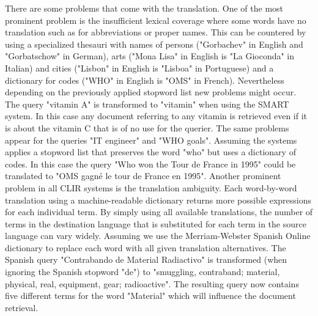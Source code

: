 \documentclass[journal]{IEEEtran}
\begin{document}
There are some problems that come with the translation.
One of the most prominent problem is the insufficient lexical coverage where some words have no translation such as for abbreviations or proper names.
This can be countered by using a specialized thesauri with names of persons ("Gorbachev" in English and "Gorbatschow" in German), arts ("Mona Lisa" in English is "La Gioconda" in Italian) and cities ("Lisbon" in English is "Lisboa" in Portuguese) and a dictionary for codes ("WHO" in English is "OMS" in French).
Nevertheless depending on the previously applied stopword list new problems might occur.
The query "vitamin A" is transformed to "vitamin" when using the SMART system.
In this case any document referring to any vitamin is retrieved even if it is about the vitamin C that is of no use for the querier.
The same problems appear for the queries "IT engineer" and "WHO goals".
Assuming the systems applies a stopword list that preserves the word "who" but uses a dictionary of codes.
In this case the query "Who won the Tour de France in 1995" could be translated to "OMS gagn\'{e} le tour de France en 1995".
Another prominent problem in all CLIR systems is the translation ambiguity.
Each word-by-word translation using a machine-readable dictionary returns more possible expressions for each individual term.
By simply using all available translations, the number of terms in the destination language that is substituted for each term in the source language can vary widely.
Assuming we use the Merriam-Webster Spanish Online dictionary to replace each word with all given translation alternatives.
The Spanish query "Contrabando de Material Radiactivo" is transformed (when ignoring the Spanish stopword "de") to "smuggling, contraband; material, physical, real, equipment, gear; radioactive".
The resulting query now contains five different terms for the word "Material" which will influence the document retrieval.

\end{document}
